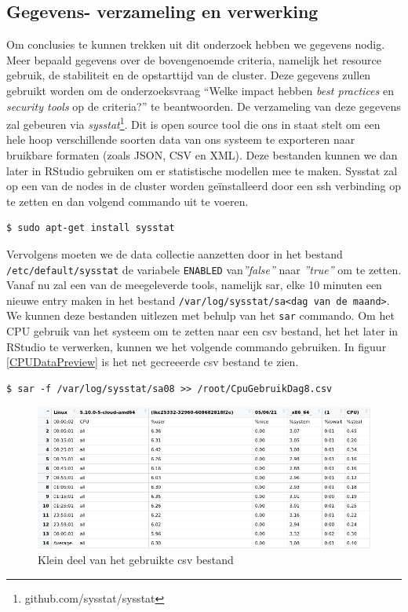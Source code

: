 \subsection{Gegevens- verzameling en verwerking}
Om conclusies te kunnen trekken uit dit onderzoek hebben we gegevens nodig. Meer bepaald gegevens over de bovengenoemde criteria, namelijk het resource gebruik, de stabiliteit en de opstarttijd van de cluster. Deze gegevens zullen gebruikt worden om de onderzoeksvraag ``Welke impact hebben \textit{best practices} en \textit{security tools} op de criteria?'' te beantwoorden. De verzameling van deze gegevens zal gebeuren via \textit{sysstat}\footnote{github.com/sysstat/sysstat}. Dit is open source tool die ons in staat stelt om een hele hoop verschillende soorten data van ons systeem te exporteren naar bruikbare formaten (zoals JSON, CSV en XML). Deze bestanden kunnen we dan later in RStudio gebruiken om er statistische modellen mee te maken. Sysstat zal op een van de nodes in de cluster worden geïnstalleerd door een ssh verbinding op te zetten en dan volgend commando uit te voeren.
\begin{verbatim} 
$ sudo apt-get install sysstat
\end{verbatim}

Vervolgens moeten we de data collectie aanzetten door in het bestand \verb|/etc/default/sysstat| de variabele \verb|ENABLED| van\textit{''false''} naar \textit{''true''} om te zetten. Vanaf nu zal een van de meegeleverde tools, namelijk sar, elke 10 minuten een nieuwe entry maken in het bestand \verb|/var/log/sysstat/sa<dag van de maand>|. We kunnen deze bestanden uitlezen met behulp van het \verb|sar| commando. Om het CPU gebruik van het systeem om te zetten naar een csv bestand, het het later in RStudio te verwerken, kunnen we het volgende commando gebruiken. In figuur \ref{CPUDataPreview} is het net gecreeerde csv bestand te zien.

\begin{verbatim} 
$ sar -f /var/log/sysstat/sa08 >> /root/CpuGebruikDag8.csv
\end{verbatim}

\begin{figure}[h]
	\centering
	\includegraphics[width=\linewidth]{img/CPUDataPreview.png}
	\caption{Klein deel van het gebruikte csv bestand}
	\label{fig:CPUDataPreview}
\end{figure}

